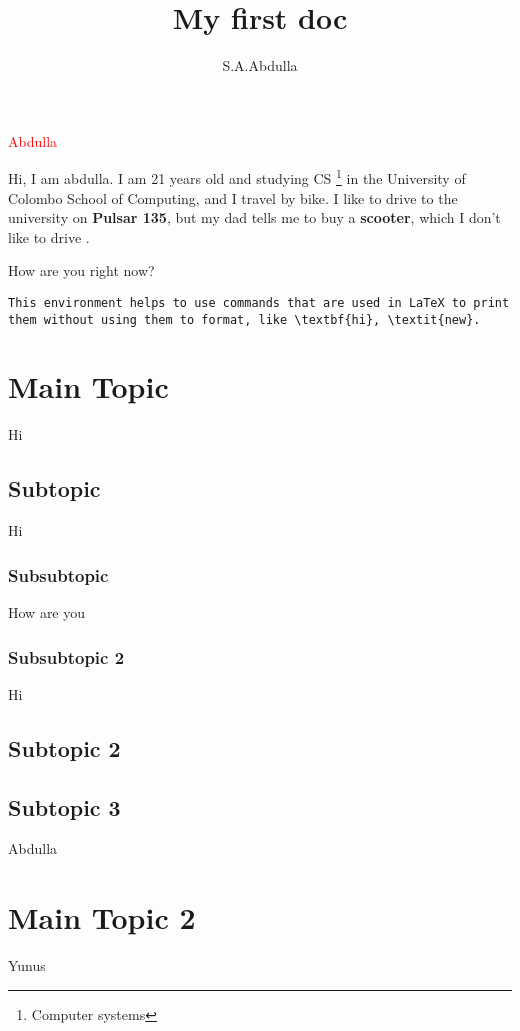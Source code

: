 \documentclass{article}
\title{My first doc}
\author{S.A.Abdulla}
\begin{document}
\maketitle
\newpage

\tableofcontents
\newpage
\listoffigures
\newpage
\listoftables
\newpage

\textcolor{red}{Abdulla}

Hi, I am {\large abdulla}. I am 21 years old and studying CS \footnote{Computer systems} in the University of Colombo School of Computing, and I travel by bike. I like to drive to the university on \textbf{Pulsar 135}, but my dad tells me to buy a \textbf{scooter}, which I don't like to drive \cite{book1}.

How are you right now?

\begin{verbatim}
This environment helps to use commands that are used in LaTeX to print them without using them to format, like \textbf{hi}, \textit{new}.
\end{verbatim}

\section{Main Topic}
Hi
\subsection{Subtopic}
Hi
\newpage
\subsubsection{Subsubtopic}
{\large How are you}
\subsubsection{Subsubtopic 2}
Hi
\subsection{Subtopic 2}
\newpage
\subsection{Subtopic 3}
Abdulla
\section{Main Topic 2}
Yunus \cite{book2}
\end{document}
